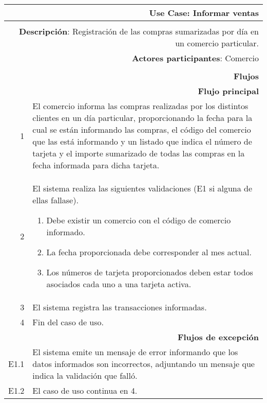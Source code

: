 \begin{tabularx}{\textwidth}{| r | X |}
\hline
\multicolumn{2}{|X|}{
\textbf{Use Case}: Informar ventas} \\

\hline
\multicolumn{2}{|c|}{\cellcolor[gray]{0.6}} \\

\hline
\multicolumn{2}{|X|}{
\textbf{Descripción}: Registración de las compras sumarizadas por día en un
comercio particular.} \\

\hline
\multicolumn{2}{|X|}{
\textbf{Actores participantes}: Comercio} \\

\hline
\multicolumn{2}{|c|}{\cellcolor[gray]{0.6} } \\

\hline
\multicolumn{2}{|X|}{
\textbf{Flujos}} \\

\hline
\multicolumn{2}{|X|}{
\textbf{Flujo principal}} \\

\hline
1 & El comercio informa las compras realizadas por los distintos clientes en un
día particular, proporcionando la fecha para la cual se están informando las
compras, el código del comercio que las está informando y un listado que indica
el número de tarjeta y el importe sumarizado de todas las compras en la fecha
informada para dicha tarjeta.\\
\hline
2 & El sistema realiza las siguientes validaciones (E1 si alguna de ellas 
fallase). 
\begin{enumerate}
\item Debe existir un comercio con el código de comercio informado.
\item La fecha proporcionada debe corresponder al mes actual.
\item Los números de tarjeta proporcionados deben estar todos asociados cada
uno a una tarjeta activa.
\end{enumerate}
\\
\hline
3 & El sistema registra las transacciones informadas. \\
\hline
4 & Fin del caso de uso. \\

\hline
\multicolumn{2}{|X|}{
\textbf{Flujos de excepción}} \\

\hline
E1.1 & El sistema emite un mensaje de error informando que los datos informados
son incorrectos, adjuntando un mensaje que indica la validación que falló. \\
\hline
E1.2 & El caso de uso continua en 4. \\

\hline
\end{tabularx}

